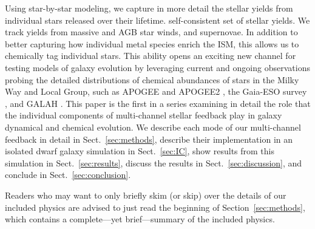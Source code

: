 \documentclass[twocolumn]{aastex61}
\begin{document}
Using star-by-star modeling, we capture in more detail the stellar yields from individual stars released over their lifetime. self-consistent set of stellar yields. 
    We track yields from massive and AGB star winds, and supernovae. 
In addition to better capturing how individual metal species enrich the ISM, this allows us to chemically tag individual stars. This ability opens an exciting new channel for testing models of galaxy evolution by leveraging current and ongoing observations probing the detailed 
   distributions of
chemical abundances of stars in the Milky Way and Local Group, such as APOGEE and APOGEE2 \citep{APOGEE2010,APOGEE}, the Gaia-ESO survey \citep{Gaia}, and GALAH \citep{GALAH}.
This paper is the first in a series examining in detail the role that the individual components of multi-channel stellar feedback play in galaxy dynamical and chemical evolution. 
We describe each mode of our multi-channel feedback 
in detail in Sect.~\ref{sec:methods}, describe their implementation in an isolated dwarf galaxy simulation
   in Sect.~\ref{sec:IC}, show results from this simulation in Sect.~\ref{sec:results}, discuss the 
   results in Sect.~\ref{sec:discussion}, and conclude in Sect.~\ref{sec:conclusion}.

Readers who may want to only briefly skim (or skip) over the details of our included physics are advised to just read the beginning of Section~\ref{sec:methods}, which contains a complete---yet brief---summary of the included physics.
\end{document}
